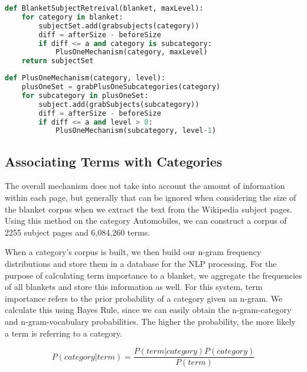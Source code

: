 \begin{lstlisting}[language=Python, frame=none, tabsize=2, caption=BlanketSubjectRetreival, label=BlanketSubjectRetreival, basicstyle=\small]
def BlanketSubjectRetreival(blanket, maxLevel):
	for category in blanket:
		subjectSet.add(grabsubjects(category))
		diff = afterSize - beforeSize
		if diff <= a and category is subcategory:
			PlusOneMechanism(category, maxLevel)
	return subjectSet
\end{lstlisting}

\begin{lstlisting}[language=Python, frame=none, tabsize=2, caption=PlusOneMechanism, label=PlusOneMechanism, basicstyle=\small]
def PlusOneMechanism(category, level):
	plusOneSet = grabPlusOneSubcategories(category)
	for subcategory in plusOneSet:
		subject.add(grabSubjects(subcategory))
		diff = afterSize - beforeSize
		if diff <= a and level > 0:
			PlusOneMechanism(subcategory, level-1)


\end{lstlisting}


\subsection{Associating Terms with Categories}

The overall mechanism does not take into account the amount of
information within each page, but generally that can be ignored when
considering the size of the blanket corpus when we extract the text
from the Wikipedia subject pages. Using this method on the category
Automobiles, we can construct a corpus of 2255 subject pages and
6,084,260 terms.

When a category's corpus is built, we then build our n-gram frequency
distributions and store them in a database for the NLP processing. For
the purpose of calculating term importance to a blanket, we aggregate
the frequencies of all blankets and store this information as
well. For this system, term importance refers to the prior probability
of a category given an n-gram. We calculate this using Bayes Rule,
since we can easily obtain the n-gram-category and n-gram-vocabulary
probabilities. The higher the probability, the more likely a term is
referring to a category.

\begin{equation}
P (category | term) = \frac{P(term | category) P(category)}{P(term)}
\end{equation}
